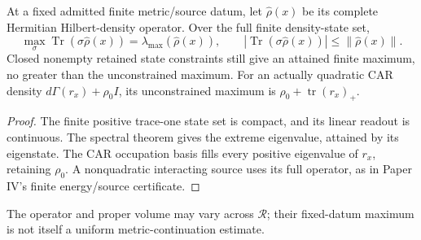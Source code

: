 \documentclass[12pt,a4paper]{article}
\begin{document}
\begin{corollary}
\label{p8:cor:fixed-source-density-maximum}
At a fixed admitted finite metric/source datum, let \(\widehat\rho(x)\)
be its complete Hermitian Hilbert-density operator. Over the full finite
density-state set,
\[
 \max_\sigma\operatorname{Tr}(\sigma\widehat\rho(x))
 =\lambda_{\max}(\widehat\rho(x)),\qquad
 |\operatorname{Tr}(\sigma\widehat\rho(x))|
 \leq\|\widehat\rho(x)\|.
\]
Closed nonempty retained state constraints still give an attained finite
maximum, no greater than the unconstrained maximum. For an actually quadratic
CAR density \(d\Gamma(r_x)+\rho_0I\), its unconstrained maximum is
\(\rho_0+\operatorname{tr}(r_x)_+\).
\end{corollary}
\begin{proof}
The finite positive trace-one state set is compact, and its linear readout
is continuous. The spectral theorem gives the extreme eigenvalue, attained
by its eigenstate. The CAR occupation basis fills every positive eigenvalue
of \(r_x\), retaining \(\rho_0\). A nonquadratic interacting source uses
its full operator, as in Paper IV's finite energy/source certificate.
\end{proof}
The operator and proper volume may vary across \(\mathcal R\); their
fixed-datum maximum is not itself a uniform metric-continuation estimate.

\end{document}
